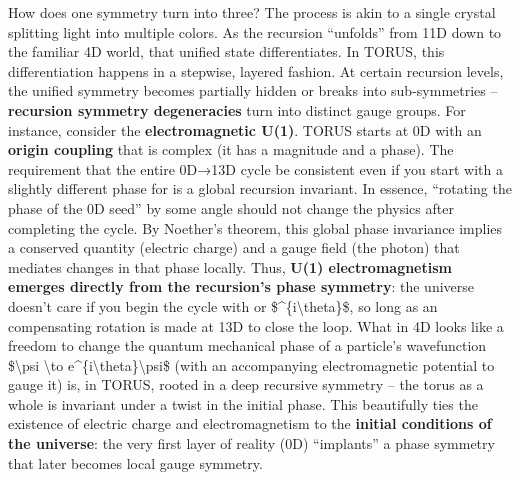 \documentclass[
]{article}
\begin{document}
{How does one symmetry turn into three? The process is akin to a single
crystal splitting light into multiple colors. As the recursion
``unfolds'' from 11D down to the familiar 4D world, that unified state
differentiates. In TORUS, this differentiation happens in a stepwise,
layered fashion. At certain recursion levels, the unified symmetry
becomes partially hidden or breaks into sub-symmetries --
\textbf{recursion symmetry degeneracies} turn into distinct gauge
groups. For instance, consider the \textbf{electromagnetic U(1)}. TORUS
starts at 0D with an \textbf{origin coupling \alpha} that is complex (it has
a magnitude and a phase). The requirement that the entire 0D→13D cycle
be consistent even if you start with a slightly different phase for \alpha is
a global recursion invariant. In essence, ``rotating the phase of the 0D
seed'' by some angle should not change the physics after completing the
cycle\hspace{0pt}. By Noether's theorem, this global phase invariance
implies a conserved quantity (electric charge) and a gauge field (the
photon) that mediates changes in that phase locally. Thus, \textbf{U(1)
electromagnetism emerges directly from the recursion's phase symmetry}:
the universe doesn't care if you begin the cycle with \alpha or
\$\alphae\^{}\{i\textbackslash theta\}\$, so long as an compensating rotation
is made at 13D to close the loop\hspace{0pt}. What in 4D looks like a
freedom to change the quantum mechanical phase of a particle's
wavefunction \$\textbackslash psi \textbackslash to
e\^{}\{i\textbackslash theta\}\textbackslash psi\$ (with an accompanying
electromagnetic potential to gauge it) is, in TORUS, rooted in a deep
recursive symmetry -- the torus as a whole is invariant under a twist in
the initial phase. This beautifully ties the existence of electric
charge and electromagnetism to the \textbf{initial conditions of the
universe}: the very first layer of reality (0D) ``implants'' a phase
symmetry that later becomes local gauge symmetry.

}
\end{document}
